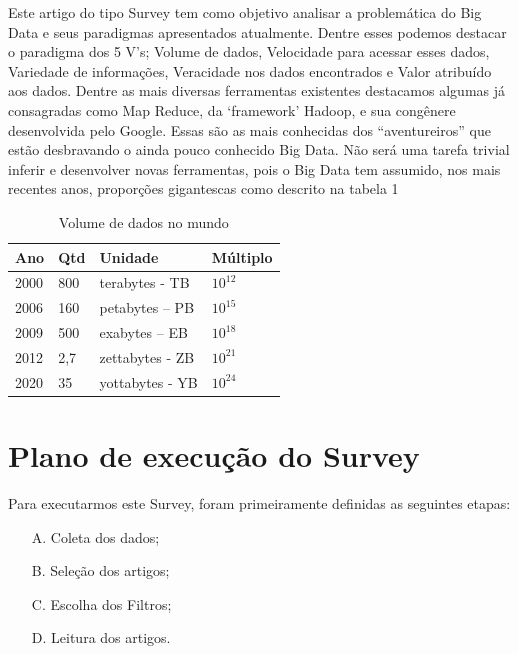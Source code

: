 \documentclass[conference,compsoc]{IEEEtran}
\begin{document}
Este artigo do tipo Survey tem como objetivo analisar a problemática do Big Data e seus paradigmas apresentados atualmente. 
Dentre esses podemos destacar o paradigma dos 5 V’s; Volume de dados, Velocidade para acessar esses dados, 
Variedade de informações, Veracidade nos dados encontrados e Valor atribuído aos dados. 
Dentre as mais diversas ferramentas existentes destacamos algumas já consagradas como Map Reduce, da ‘framework’ Hadoop,
e sua congênere desenvolvida pelo Google. Essas são as mais conhecidas dos “aventureiros” que estão desbravando o ainda
pouco conhecido Big Data. Não será uma tarefa trivial inferir e desenvolver novas ferramentas, pois o Big Data tem 
assumido, nos mais recentes anos, proporções gigantescas como descrito na tabela 1




\begin{table}[htbp]
\scriptsize
\centering
\caption{Volume de dados no mundo}
\begin{tabular}{|p{6mm}|p{5mm}|p{16mm}|p{8mm}|}
\hline
Ano & Qtd & Unidade & Múltiplo \\
\hline
2000 & 800 & terabytes - TB & $10^{12}$ \\ \hline

2006 & 160 & petabytes – PB & $10^{15}$ \\ \hline

2009 & 500 & exabytes – EB & $10^{18}$ \\ \hline

2012 & 2,7 & zettabytes - ZB & $10^{21}$ \\ \hline

2020 & 35 & yottabytes - YB & $10^{24}$ \\ \hline

\end{tabular}
\end{table}


\section{Plano de execução do Survey}

Para executarmos este Survey, foram primeiramente definidas as seguintes etapas:

\begin{enumerate}
 \item[A.] Coleta dos dados;
 \item[B.] Seleção dos artigos; 
 \item[C.] Escolha dos Filtros;
 \item[D.] Leitura dos artigos.
\end{enumerate}
\end{document}
